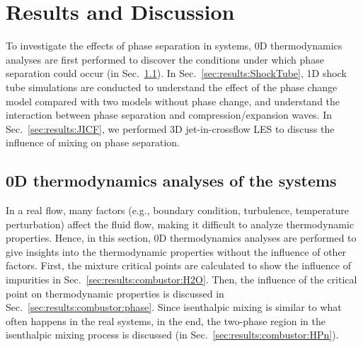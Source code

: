 \section{Results and Discussion}
\label{sec:result}


To investigate the effects of phase separation in  systems, 0D thermodynamics analyses are first performed to discover the conditions under which phase separation could occur (in Sec.~\ref{sec:results:ThermAnalysis}). In Sec.~\ref{sec:results:ShockTube}, 1D shock tube simulations are conducted to understand the effect of the phase change model compared with two models without phase change, and understand the interaction between phase separation and compression/expansion waves. In Sec.~\ref{sec:results:JICF}, we performed 3D jet-in-crossflow LES to discuss the influence of mixing on phase separation. 

\subsection{0D thermodynamics analyses of the  systems}
\label{sec:results:ThermAnalysis}

In a real flow, many factors (e.g., boundary condition, turbulence, temperature perturbation) affect the fluid flow, making it difficult to analyze thermodynamic properties. Hence, in this section, 0D thermodynamics analyses are performed to give insights into the thermodynamic properties without the influence of other factors. First, the mixture critical points are calculated to show the influence of impurities in Sec.~\ref{sec:results:combustor:H2O}. Then, the influence of the critical point on thermodynamic properties is discussed in Sec.~\ref{sec:results:combustor:phase}. Since isenthalpic mixing is similar to what often happens in the real  systems, in the end, the two-phase region in the isenthalpic mixing process is discussed (in Sec.~\ref{sec:results:combustor:HPn}). 

